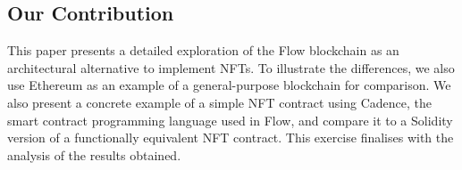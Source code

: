 \documentclass[../NFTComp_IEEE.tex]{subfiles}
\begin{document}
\subsection{Our Contribution}
This paper presents a detailed exploration of the Flow blockchain as an architectural alternative to implement NFTs. To illustrate the differences, we also use Ethereum as an example of a general-purpose blockchain for comparison. We also present a concrete example of a simple NFT contract using Cadence, the smart contract programming language used in Flow, and compare it to a Solidity version of a functionally equivalent NFT contract. This exercise finalises with the analysis of the results obtained.
\end{document}

